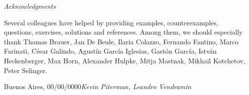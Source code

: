 \preface

%
%
%
% 
%




\textit{Acknowledgments} 

Several colleagues have helped by providing examples, counterexamples,
questions, exercises, solutions and references.  Among them, we should
especially thank Thomas Brauer, Jan De Beule, Ilaria Colazzo, Fernando Fantino, Marco Farinati, C\'esar
Galindo, Agust\'in Garc\'ia Iglesias, Gast\'on Garc\'ia, Istv\'an Heckenberger, 
Max Horn, 
Alexander Hulpke, Mitja Mastnak, Mikhail Kotchetov, Peter Selinger.

\vspace{\baselineskip}
\begin{flushright}\noindent
Buenos Aires, 00/00/0000\hfill {\it Kevin Piterman, Leandro Vendramin}\\
\end{flushright}


